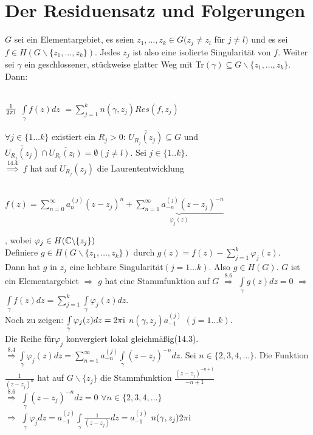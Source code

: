 \documentclass[a4paper,twoside,DIV15,BCOR12mm]{scrbook}
\def\wegint{\ensuremath{\int\limits_\gamma}}
\def\ie{\rm i}
\begin{document}
\chapter{Der Residuensatz und Folgerungen} 

\begin{satz}[Residuensatz]
  $G$ sei ein Elementargebiet, es seien $z_1, \ldots, z_k \in G (z_j \neq z_l$ f\"ur
   $j \neq l)$ und es sei $f \in H(G \backslash \{z_1, \ldots, z_k\})$. Jedes $z_j$
  ist also eine isolierte Singularit\"at von $f$. Weiter sei $\gamma$ ein
  geschlossener, st\"uckweise glatter Weg mit Tr$(\gamma) \subseteq G \backslash
  \{z_1, \ldots, z_k\}$. \\
  Dann: \\ \\
  \centerline{$\frac{1}{2 \pi \ie}$ 
  $ \int\limits_{\gamma} f(z) dz $
  $= \sum\limits_{j=1}^k n(\gamma, z_j) Res(f, z_j)$ }
\end{satz}
\begin{beweis}
  $\forall j \in \{1 \ldots k\}$ existiert ein $R_j > 0$: 
  $\overline{U_{R_j}(z_j)} \subseteq G$  
  und $\overline{U_{R_j}(z_j)} \cap \overline{U_{R_l}(z_l)} = \emptyset ( j \neq l)$.
  Sei $j \in \{1..k\}$. \\
  $\stackrel{\text{14.4}}{\Rightarrow} $ $f$ hat auf $U_{R_j}(z_j)$ die 
  Laurententwicklung \\ \\ \centerline{$f(z) = \sum\limits_{n=0}^{\infty}
  a_n^{(j)}(z-z_j)^n + 
  \underbrace{\sum\limits_{n=1}^{\infty}
  a_{-n}^{(j)}(z-z_j)^{-n}}_{\varphi_j(z)}$}, wobei $\varphi_j \in H(\mathbb{C}
  \backslash \{z_j \})$ \\ 
  Definiere $g \in H(G \backslash \{z_1,\ldots, z_k\})$ durch $g(z) = f(z) -
  \sum\limits_{j=1}^{k} \varphi_j(z)$. \\
  Dann hat $g$ in $z_j$ eine hebbare Singularit\"at$(j = 1\ldots k)$. Also $g \in
  H(G)$. $G$ ist ein Elementargebiet $\Rightarrow$ $g$ hat eine Stammfunktion auf
  $G$ $\stackrel{\text{8.6}}{\Rightarrow}$ $\int\limits_{\gamma} g(z)  dz = 0$
  $\Rightarrow$ $\wegint f(z) dz = \sum\limits_{j=1}^k \wegint \varphi_j(z) dz$.\\
  Noch zu zeigen: $\wegint  \varphi_j(z) dz = 2 \pi \ie $ $ n(\gamma, z_j)
  a_{-1}^{(j)}$ $(j = 1\ldots k)$. \\
  Die Reihe f\"ur$\varphi_j$ konvergiert lokal gleichm\"a{\ss}ig(14.3). \\
  $\stackrel{\text{8.4}}{\Rightarrow} \wegint \varphi_j(z) dz = \sum\limits_{n=1}^{\infty}
  a_{-n}^{(j)} \wegint (z-z_j)^{-n} dz$. Sei $n \in \{2,3,4, \ldots\}$. Die
  Funktion $\frac{1}{(z-z_j)^n}$ hat auf $G \backslash \{z_j\}$ die Stammfunktion
  $\frac{(z-z_j)^{-n+1}}{-n+1}$ \\ $\stackrel{8.6}{\Rightarrow}$ $\wegint
  (z-z_j)^{-n} dz = 0$ $\forall n \in \{2,3,4,\ldots\}$ \\ $\Rightarrow$ $\wegint
  \varphi_j dz = a_{-1}^{(j)} \wegint \frac{1}{(z-z_j)} dz = a_{-1}^{(j)}$
  $n(\gamma, z_j) 2 \pi \ie$
\end{beweis}
\end{document}
